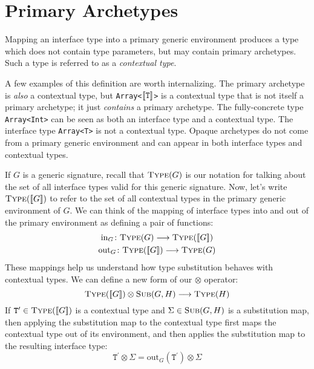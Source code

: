 \documentclass[../generics]{subfiles}
\begin{document}
\section{Primary Archetypes}\label{archetypesubst}

Mapping an interface type into a primary generic environment produces a type which does not contain type parameters, but may contain primary archetypes. Such a type is referred to as a \emph{contextual type}. 

A few examples of this definition are worth internalizing. The primary archetype  is \emph{also} a contextual type, but \texttt{Array<$[\![\texttt{T}]\!]$>} is a contextual type that is not itself a primary archetype; it just \emph{contains} a primary archetype. The fully-concrete type \texttt{Array<Int>} can be seen as both an interface type and a contextual type. The interface type \texttt{Array<T>} is not a contextual type. Opaque archetypes do not come from a primary generic environment and can appear in both interface types and contextual types.

If $G$ is a generic signature, recall that $\textsc{Type}({G})$ is our notation for talking about the set of all interface types valid for this generic signature. Now, let's write $\textsc{Type}({[\![G]\!]})$ to refer to the set of all contextual types in the primary generic environment of $G$. We can think of the mapping of interface types into and out of the primary environment as defining a pair of functions:
\begin{gather*}
\mathrm{in}_G\colon\textsc{Type}({G})\longrightarrow\textsc{Type}({[\![G]\!]})\\
\mathrm{out}_G\colon\textsc{Type}({[\![G]\!]})\longrightarrow\textsc{Type}({G})
\end{gather*}
These mappings help us understand how type substitution behaves with contextual types. We can define a new form of our $\otimes$ operator:
\[\textsc{Type}({[\![G]\!]})\otimes\textsc{Sub}({G, H})\longrightarrow\textsc{Type}({H})\]
If $\texttt{T}^\prime\in\textsc{Type}({[\![G]\!]})$ is a contextual type and $\Sigma\in \textsc{Sub}({G, H})$ is a substitution map, then applying the substitution map to the contextual type first maps the contextual type out of its environment, and then applies the substitution map to the resulting interface type:
\[\texttt{T}^\prime\otimes \Sigma = \mathrm{out}_G(\texttt{T}^\prime)\otimes \Sigma\]
\end{document}
